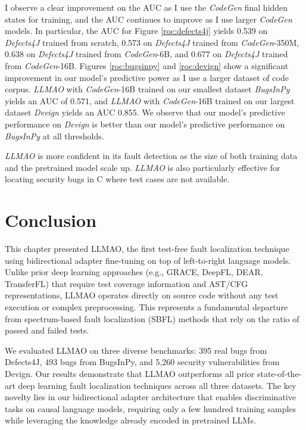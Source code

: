 \documentclass[12pt,openany,oneside,table]{cmuthesis}
\begin{document}
I observe a clear improvement on the AUC as I use the \textit{CodeGen} final hidden states for training, and the AUC continues to improve as I use larger \textit{CodeGen} models. 
In particular, the AUC for Figure \ref{roc:defects4j} yields 0.539 on \textit{Defects4J} trained from scratch, 0.573 on \textit{Defects4J} trained from \textit{CodeGen}-350M, 0.638 on \textit{Defects4J} trained from \textit{CodeGen}-6B, and 0.677 on \textit{Defects4J} trained from \textit{CodeGen}-16B.
Figures \ref{roc:bugsinpy} and \ref{roc:devign} show a significant improvement in our model's predictive power as I use a larger dataset of code corpus. \textit{LLMAO} with \textit{CodeGen}-16B trained on our smallest dataset \textit{BugsInPy} yields an AUC of 0.571, and \textit{LLMAO} with \textit{CodeGen}-16B trained on our largest dataset \textit{Devign} yields an AUC 0.855. We observe that our model's predictive performance on \textit{Devign} is better than our model's predictive performance on \textit{BugsInPy} at all thresholds.

    \begin{tcolorbox}
    [colback=white,colframe=black,arc=0pt,boxrule=0.5pt,title=RQ4 Summary,boxsep=2pt,left=1pt,right=1pt,top=1pt,bottom=1pt,fonttitle=\bfseries]
    \textit{LLMAO} is more confident in its fault detection as the size of both training data and the pretrained model scale up. \textit{LLMAO} is also particularly effective for locating security bugs in C where test cases are not available.

    \vspace{0.5em}
    \end{tcolorbox}

\section{Conclusion}
\label{sec:LLMAO-conclusion}
This chapter presented LLMAO, the first test-free fault localization technique using bidirectional adapter fine-tuning on top of left-to-right language models. Unlike prior deep learning approaches (e.g., GRACE, DeepFL, DEAR, TransferFL) that require test coverage information and AST/CFG representations, LLMAO operates directly on source code without any test execution or complex preprocessing. This represents a fundamental departure from spectrum-based fault localization (SBFL) methods that rely on the ratio of passed and failed tests.

We evaluated LLMAO on three diverse benchmarks: 395 real bugs from Defects4J, 493 bugs from BugsInPy, and 5,260 security vulnerabilities from Devign. Our results demonstrate that LLMAO outperforms all prior state-of-the-art deep learning fault localization techniques across all three datasets. The key novelty lies in our bidirectional adapter architecture that enables discriminative tasks on causal language models, requiring only a few hundred training samples while leveraging the knowledge already encoded in pretrained LLMs.
\end{document}
